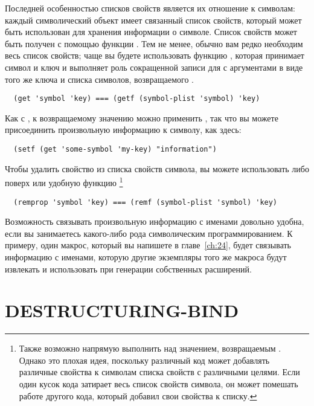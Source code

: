 Последней особенностью списков свойств является их отношение к символам: каждый
символический объект имеет связанный список свойств, который может быть использован для
хранения информации о символе. Список свойств может быть получен с помощью функции
. Тем не менее, обычно вам редко необходим весь список свойств; чаще вы
будете использовать функцию , которая принимает символ и ключ и выполняет роль
сокращенной записи для  с аргументами в виде того же ключа и списка символов,
возвращаемого .

\begin{verbatim}
  (get 'symbol 'key) === (getf (symbol-plist 'symbol) 'key)
\end{verbatim}

Как с , к возвращаемому значению  можно применить , так
что вы можете присоединить произвольную информацию к символу, как здесь:

\begin{verbatim}
  (setf (get 'some-symbol 'my-key) "information")
\end{verbatim}

Чтобы удалить свойство из списка свойств символа, вы можете использовать либо 
поверх  или удобную функцию  \footnote{Также возможно
  напрямую выполнить  над значением, возвращаемым . Однако
  это плохая идея, поскольку различный код может добавлять различные свойства к символам
  списка свойств с различными целями. Если один кусок кода затирает весь список свойств
  символа, он может помешать работе другого кода, который добавил свои свойства к списку.}

\begin{verbatim}
  (remprop 'symbol 'key) === (remf (symbol-plist 'symbol) 'key)
\end{verbatim}

Возможность связывать произвольную информацию с именами довольно удобна, если вы
занимаетесь какого-либо рода символическим программированием. К примеру, один макрос,
который вы напишете в главе~\ref{ch:24}, будет связывать информацию с именами, которую
другие экземпляры того же макроса будут извлекать и использовать при генерации собственных
расширений.

\section{DESTRUCTURING-BIND}

